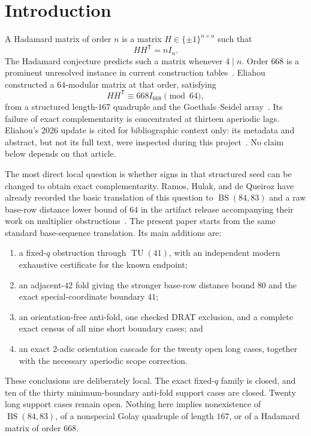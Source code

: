 \documentclass[11pt]{article}
\theoremstyle{remark}
\newcommand{\BS}{\operatorname{BS}}
\newcommand{\TU}{\operatorname{TU}}
\begin{document}
\section{Introduction}

A Hadamard matrix of order $n$ is a matrix
$H\in\{\pm1\}^{n\times n}$ such that
\[
 HH^{\mathsf T}=nI_n.
\]
The Hadamard conjecture predicts such a matrix whenever $4\mid n$.
Order $668$ is a prominent unresolved instance in current construction
tables~\cite{cati-pasechnik,sage}.  Eliahou constructed a
$64$-modular matrix at that order, satisfying
\[
 HH^{\mathsf T}\equiv 668I_{668}\pmod {64},
\]
from a structured length-$167$ quadruple and the Goethals--Seidel
array~\cite{eliahou-2025}.  Its failure of exact
complementarity is concentrated at thirteen aperiodic lags.
Eliahou's 2026 update is cited for bibliographic context only:
its metadata and abstract, but not its full text, were inspected during
this project~\cite{eliahou-2026}.  No claim below depends on that article.

The most direct local question is whether signs in that structured seed can
be changed to obtain exact complementarity.  Ramos, Hulak, and de Queiroz
have already recorded the basic translation of this question to
$\BS(84,83)$ and a raw base-row distance lower bound of $64$ in the
artifact release accompanying their work on multiplier
obstructions~\cite{ramos-2026,ramos-artifacts}.  The present paper starts
from the same standard base-sequence translation.  Its main additions are:
\begin{enumerate}
  \item a fixed-$q$ obstruction through $\TU(41)$, with an independent
        modern exhaustive certificate for the known endpoint;
  \item an adjacent-$42$ fold giving the stronger base-row distance bound
        $80$ and the exact special-coordinate boundary $41$;
  \item an orientation-free anti-fold, one checked DRAT exclusion, and a
        complete exact census of all nine short boundary cases; and
  \item an exact $2$-adic orientation cascade for the twenty open long
        cases, together with the necessary aperiodic scope correction.
\end{enumerate}

These conclusions are deliberately local.  The exact fixed-$q$ family is
closed, and ten of the thirty minimum-boundary anti-fold support cases are
closed.  Twenty long support cases remain open.  Nothing here implies
nonexistence of $\BS(84,83)$, of a nonspecial Golay quadruple of length
$167$, or of a Hadamard matrix of order $668$.
\end{document}
